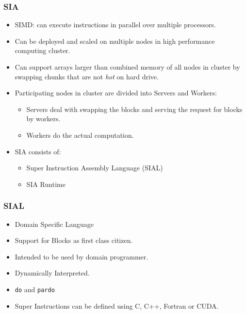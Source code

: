 \documentclass{beamer}
\begin{document}
\begin{frame}\frametitle{SIA}
  \begin{itemize}
    \pause
  \item SIMD: can execute instructions in parallel over multiple processors.
    \pause
  \item Can be deployed and scaled on multiple nodes in high performance computing cluster.
    \pause
  \item Can support arrays larger than combined memory of all nodes in cluster by
    swapping chunks that are not \textit{hot} on hard drive.
    \pause
  \item Participating nodes in cluster are divided into Servers and Workers:
    \begin{itemize}
      \pause
    \item Servers deal with swapping the blocks and serving the request for blocks
      by workers.
      \pause
    \item Workers do the actual computation.
    \end{itemize}
    \pause
  \item SIA consists of:
    \begin{itemize}
      \pause
    \item Super Instruction Assembly Language (SIAL)
      \pause
    \item SIA Runtime
    \end{itemize}
  \end{itemize}
\end{frame}

\begin{frame}\frametitle{SIAL}
  \begin{itemize}
    \pause
  \item Domain Specific Language
    \pause
  \item Support for Blocks as first class citizen.
    \pause
  \item Intended to be used by domain programmer.
    \pause
  \item Dynamically Interpreted.
    \pause
  \item \texttt{do} and \texttt{pardo}
    \pause
  \item Super Instructions can be defined using C, C++, Fortran
    \pause
    or CUDA.
  \end{itemize}
\end{frame}
\end{document}
